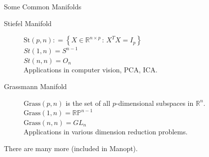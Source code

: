 \documentclass[xcolor=dvipsnames,t]{beamer} %
\newcommand{\reals}{\mathbb{R}}
\newcommand{\defeq}{\mathrel{\mathop:}=}
\begin{document}
\begin{frame}{Some Common Manifolds}

   \begin{description}
      \item[Stiefel Manifold] $\mathrm{St}(p,n) \defeq \left\{X\in\reals^{n\times p}\,:\,X^TX=I_p\right\}$\\
         $St(1,n) = S^{n-1}$\\
         $St(n,n) = O_n$\\[.5em]
         Applications in computer vision, PCA, ICA.\\[1em]

      \item[Grassmann Manifold] $\mathrm{Grass}(p,n)$ is the set of all $p$-dimensional subspaces in $\reals^n$.\\
         
         $\mathrm{Grass}(1,n) = \reals\mathbb{P}^{n-1}$\\
         $\mathrm{Grass}(n,n) = GL_n$\\
         Applications in various dimension reduction problems.
   \end{description}

   There are many more (included in Manopt).
\end{frame}


\end{document}

